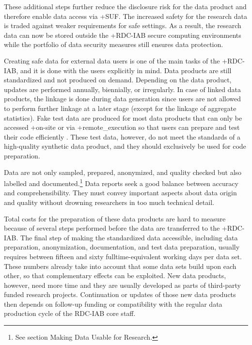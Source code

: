 \documentclass[
]{book}
\begin{document}
These additional steps further reduce the disclosure risk for the data product and therefore enable data access via +SUF\textbar. The increased safety for the research data is traded against weaker requirements for safe settings. As a result, the research data can now be stored outside the +RDC-IAB\textbar{} secure computing environments while the portfolio of data security measures still ensures data protection.

Creating safe data for external data users is one of the main tasks of the +RDC-IAB\textbar, and it is done with the users explicitly in mind. Data products are still standardized and not produced on demand. Depending on the data product, updates are performed annually, biennially, or irregularly. In case of linked data products, the linkage is done during data generation since users are not allowed to perform further linkage at a later stage (except for the linkage of aggregate statistics). Fake test data are produced for most data products that can only be accessed +on-site\textbar{} or via +remote\_execution\textbar{} so that users can prepare and test their code efficiently \citep{jacobebbinghaus2010}. These test data, however, do not meet the standards of a high-quality synthetic data product, and they should exclusively be used for code preparation.

Data are not only sampled, prepared, anonymized, and quality checked but also labelled and documented.\footnote{See section Making Data Usable for Research.} Data reports seek a good balance between accuracy and comprehensibility. They must convey important aspects about data origin and quality without drowning researchers in too much technical detail.

Total costs for the preparation of these data products are hard to measure because of several steps performed before the data are transferred to the +RDC-IAB\textbar. The final step of making the standardized data accessible, including data preparation, anonymization, documentation, and test data preparation, usually requires between fifteen and sixty fulltime-equivalent working days per data set. These numbers already take into account that some data sets build upon each other, so that complementary effects can be exploited. New data products, however, need more time and they are usually developed as parts of third-party funded research projects. Continuation or updates of those new data products then depends on follow-up funding or compatibility with the regular data production cycle of the RDC-IAB core staff.
\end{document}
